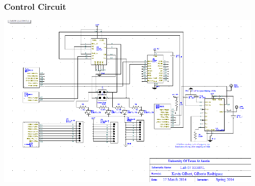 \documentclass[twoside]{article}
\begin{document}
		\subsubsection{Control Circuit}
			\includegraphics[width=\textwidth]{circuitDiagram}

 
\end{document}
